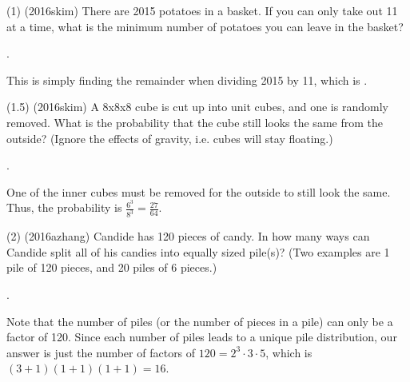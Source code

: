 \documentclass[11pt]{article}
\begin{document}
\begin{problem}
(1) (2016skim) There are 2015 potatoes in a basket. If you can only take out 11 at a time, what is the minimum number of potatoes you can leave in the basket?
\end{problem}

\begin{answer}
.
\end{answer}

\begin{solution}
This is simply finding the remainder when dividing 2015 by 11, which is .
\end{solution}

\begin{problem}
(1.5) (2016skim) A 8x8x8 cube is cut up into unit cubes, and one is randomly removed. What is the probability that the cube still looks the same from the outside? (Ignore the effects of gravity, i.e. cubes will stay floating.)
\end{problem}

\begin{answer}
.
\end{answer}

\begin{solution}
One of the inner cubes must be removed for the outside to still look the same. Thus, the probability is $\frac{6^3}{8^3} = \boxed{\frac{27}{64}}$.
\end{solution}

\begin{problem}
(2) (2016azhang) Candide has 120 pieces of candy. In how many ways can Candide split all of his candies into equally sized pile(s)? (Two examples are 1 pile of 120 pieces, and 20 piles of 6 pieces.)
\end{problem}

\begin{answer}
.
\end{answer}

\begin{solution}
Note that the number of piles (or the number of pieces in a pile) can only be a factor of 120. Since each number of piles leads to a unique pile distribution, our answer is just the number of factors of $120 = 2^{3}\cdot3\cdot5$, which is $(3+1)(1+1)(1+1) = \boxed{16}$.
\end{solution}
\end{document}
